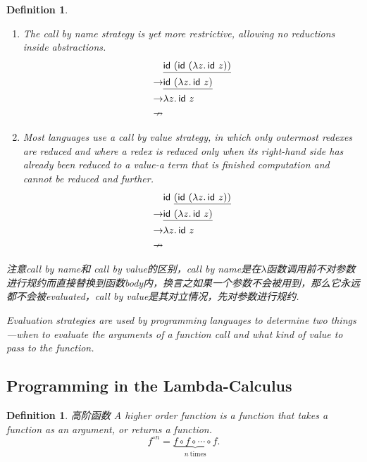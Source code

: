 \documentclass{article}
\theoremstyle{plain}
\newtheorem{definition}[theorem]{Definition}
\theoremstyle{nonumberplain}
\newcommand{\lam}[2]{\ensuremath{\lambda #1\ldotp #2}} %
\newcommand{\term}[1]{\ensuremath\mathsf{#1}}
\begin{document}
\begin{definition}
\begin{enumerate}
$$\begin{aligned}
	\rightarrow & \lam{z}{z} \\
	\nrightarrow
	\end{aligned}
	$$
	\item The {\color{red} call by name} strategy is yet more restrictive, allowing no reductions inside abstractions. 
	$$
	\begin{aligned}
	& \underline{\term{id}~(\term{id}~(\lam{z}{\term{id}~z}))} \\
	\rightarrow & \underline{\term{id}~(\lam{z}{\term{id}}~z)} \\
	\rightarrow & \lam{z}{\term{id}~z} \\
	\nrightarrow
	\end{aligned}
	$$
	\item Most languages use a {\color{red} call by value} strategy, in which only outermost redexes are reduced and where a redex is reduced only when its right-hand side has already been reduced to a value-a term that is finished computation and cannot be reduced and further.
	$$
	\begin{aligned}
	& \term{id}~\underline{(\term{id}~(\lam{z}{\term{id}~z}))} \\
	\rightarrow & \underline{\term{id}~(\lam{z}{\term{id}}~z)} \\
	\rightarrow & \lam{z}{\term{id}~z} \\
	\nrightarrow
	\end{aligned}
	$$
\end{enumerate}

{\color{blue} 注意call by name和 call by value的区别，call by name是在$\lambda$函数调用前不对参数进行规约而直接替换到函数body内，换言之如果一个参数不会被用到，那么它永远都不会被evaluated，call by value是其对立情况，先对参数进行规约}.

{\color{red} Evaluation strategies are used by programming languages to determine two things—when to evaluate the arguments of a function call and what kind of value to pass to the function}.
\end{definition}

\newpage
\subsection{Programming in the Lambda-Calculus}

\begin{definition}
\rm {\color{red} 高阶函数} A higher order function is a function that takes a function as an argument, or returns a function.
$$
f^{\circ n} = \underbrace{f \circ f \circ \cdots \circ f}_{n~\text{times}}.
$$
\end{definition}
\end{document}
